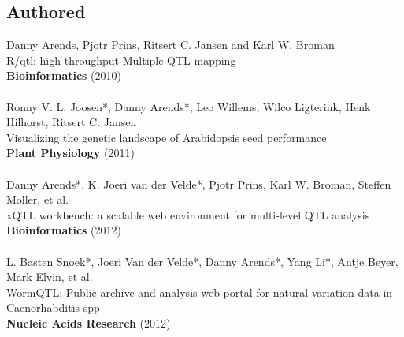 \documentclass[11pt, twoside, a5paper]{report}
\newcommand{\authors}[1]{\small{#1}}
\newcommand{\bold}[1]{{\bfseries #1}}
\begin{document}
\subsection*{Authored}
  \authors{Danny Arends, Pjotr Prins, Ritsert C. Jansen and Karl W. Broman}\\
  R/qtl: high throughput Multiple QTL mapping\\
  \bold{Bioinformatics} (2010)\\\\
  \authors{Ronny V. L. Joosen*, Danny Arends*, Leo Willems, Wilco Ligterink, Henk Hilhorst, Ritsert C. Jansen}\\
  Visualizing the genetic landscape of Arabidopsis seed performance\\
  \bold{Plant Physiology} (2011)\\\\
  \authors{Danny Arends*, K. Joeri van der Velde*, Pjotr Prins, Karl W. Broman, Steffen Moller, et al.}\\
  xQTL workbench: a scalable web environment for multi-level QTL analysis\\
  \bold{Bioinformatics} (2012)\\\\
  \authors{L. Basten Snoek*, Joeri Van der Velde*, Danny Arends*, Yang Li*, Antje Beyer, Mark Elvin, et al.}\\
  WormQTL: Public archive and analysis web portal for natural variation data in Caenorhabditis spp\\
  \bold{Nucleic Acids Research} (2012)
\end{document}
